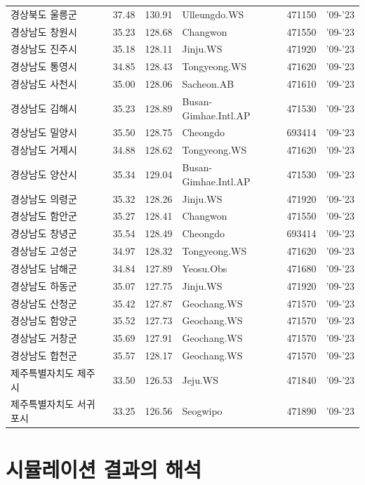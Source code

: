 \begin{longtable}{lcclcc}
  경상북도 울릉군 & 37.48 & 130.91 & Ulleungdo.WS & 471150 & '09-'23 \\
  경상남도 창원시 & 35.23 & 128.68 & Changwon & 471550 & '09-'23 \\
  경상남도 진주시 & 35.18 & 128.11 & Jinju.WS & 471920 & '09-'23 \\
  경상남도 통영시 & 34.85 & 128.43 & Tongyeong.WS & 471620 & '09-'23 \\
  경상남도 사천시 & 35.00 & 128.06 & Sacheon.AB & 471610 & '09-'23 \\
  경상남도 김해시 & 35.23 & 128.89 & Busan-Gimhae.Intl.AP & 471530 & '09-'23 \\
  경상남도 밀양시 & 35.50 & 128.75 & Cheongdo & 693414 & '09-'23 \\
  경상남도 거제시 & 34.88 & 128.62 & Tongyeong.WS & 471620 & '09-'23 \\
  경상남도 양산시 & 35.34 & 129.04 & Busan-Gimhae.Intl.AP & 471530 & '09-'23 \\
  경상남도 의령군 & 35.32 & 128.26 & Jinju.WS & 471920 & '09-'23 \\
  경상남도 함안군 & 35.27 & 128.41 & Changwon & 471550 & '09-'23 \\
  경상남도 창녕군 & 35.54 & 128.49 & Cheongdo & 693414 & '09-'23 \\
  경상남도 고성군 & 34.97 & 128.32 & Tongyeong.WS & 471620 & '09-'23 \\
  경상남도 남해군 & 34.84 & 127.89 & Yeosu.Obs & 471680 & '09-'23 \\
  경상남도 하동군 & 35.07 & 127.75 & Jinju.WS & 471920 & '09-'23 \\
  경상남도 산청군 & 35.42 & 127.87 & Geochang.WS & 471570 & '09-'23 \\
  경상남도 함양군 & 35.52 & 127.73 & Geochang.WS & 471570 & '09-'23 \\
  경상남도 거창군 & 35.69 & 127.91 & Geochang.WS & 471570 & '09-'23 \\
  경상남도 합천군 & 35.57 & 128.17 & Geochang.WS & 471570 & '09-'23 \\
  제주특별자치도 제주시 & 33.50 & 126.53 & Jeju.WS & 471840 & '09-'23 \\
  제주특별자치도 서귀포시 & 33.25 & 126.56 & Seogwipo & 471890 & '09-'23 \\
\end{longtable}



\chapter{시뮬레이션 결과의 해석}

